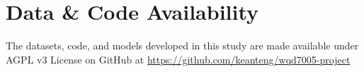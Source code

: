 \section{Data \& Code Availability}
The datasets, code, and models developed in this study are made available under AGPL v3 License on GitHub at \url{https://github.com/keanteng/wqd7005-project}